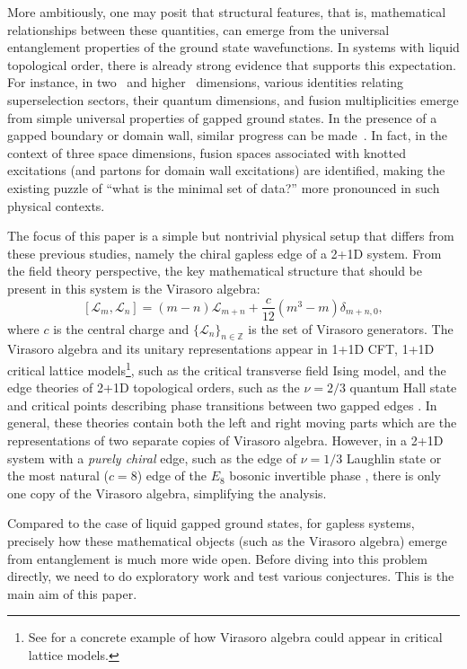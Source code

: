 \documentclass[12pt, nofootinbib]{article}
\theoremstyle{plain}
\theoremstyle{assumption}
\theoremstyle{definition}
\theoremstyle{plain}
\theoremstyle{plain}
\theoremstyle{plain}
\theoremstyle{plain}
\theoremstyle{plain}
\def\Lcft{\mathscr{L}}
\begin{document}
More ambitiously, one may posit that structural features, that is, mathematical relationships between these quantities, can emerge from the universal entanglement properties of the ground state wavefunctions. In systems with liquid topological order, there is already strong evidence that supports this expectation. For instance, in two~\cite{shi2020fusion} and higher~\cite{knots-paper,Shi:2023kwr} dimensions, various identities relating superselection sectors, their quantum dimensions, and fusion multiplicities emerge from simple universal properties of gapped ground states. In the presence of a gapped boundary or domain wall, similar progress can be made~\cite{Shi:2020rne}. In fact, in the context of three space dimensions, fusion spaces associated with knotted excitations (and partons for domain wall excitations) are identified, making the existing puzzle of ``what is the minimal set of data?'' more pronounced in such physical contexts. 


The focus of this paper is a simple but nontrivial physical setup that differs from these previous studies, namely the chiral gapless edge of a 2+1D system. From the field theory perspective, the key mathematical structure that should be present in this system is the Virasoro algebra:
\begin{equation}\label{eq:vir}
[\Lcft_m, \Lcft_n] = (m-n) \Lcft_{m+n} + \frac{c}{12} (m^3-m) \delta_{m+n,0},
\end{equation}
where $c$ is the central charge and $\{ \Lcft_n\}_{n \in \mathbb{Z}}$ is the set of Virasoro generators.
The Virasoro algebra and its unitary representations appear in 1+1D CFT, 1+1D critical lattice models\footnote{See \cite{Koo:1993wz} for a concrete example of how Virasoro algebra could appear in critical lattice models.}, such as the critical transverse field Ising model, and the edge theories of 2+1D topological orders, such as the $\nu=2/3$ quantum Hall state \cite{Levin2013} and critical points describing phase transitions between two gapped edges \cite{Chatterjee2022}. 
In general, these theories contain both the left and right moving parts which are the representations of two separate copies of Virasoro algebra.  
However, in a 2+1D system with a \emph{purely chiral} edge, such as the edge of $\nu = 1/3$ Laughlin state \cite{Laughlin1983} or the most natural ($c = 8$) edge of the $E_8$ bosonic invertible phase \cite{Kitaev2005}, there is only one copy of the Virasoro algebra, simplifying the analysis. 

Compared to the case of liquid gapped ground states, 
for gapless systems, 
precisely how these mathematical objects (such as the Virasoro algebra) emerge from entanglement is much more wide open. Before diving into this problem directly, we need to do exploratory work and test various conjectures. This is the main aim of this paper. 
\end{document}
